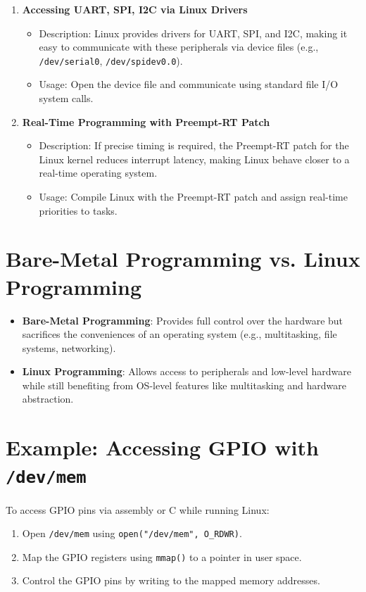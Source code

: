 \documentclass{article}
\begin{document}
\begin{enumerate}
    \item \textbf{Accessing UART, SPI, I2C via Linux Drivers}
    \begin{itemize}
        \item Description: Linux provides drivers for UART, SPI, and I2C, making it easy to communicate with these peripherals via device files (e.g., \texttt{/dev/serial0}, \texttt{/dev/spidev0.0}).
        \item Usage: Open the device file and communicate using standard file I/O system calls.
    \end{itemize}

    \item \textbf{Real-Time Programming with Preempt-RT Patch}
    \begin{itemize}
        \item Description: If precise timing is required, the Preempt-RT patch for the Linux kernel reduces interrupt latency, making Linux behave closer to a real-time operating system.
        \item Usage: Compile Linux with the Preempt-RT patch and assign real-time priorities to tasks.
    \end{itemize}
\end{enumerate}

\section{Bare-Metal Programming vs. Linux Programming}
\begin{itemize}
    \item \textbf{Bare-Metal Programming}: Provides full control over the hardware but sacrifices the conveniences of an operating system (e.g., multitasking, file systems, networking).
    \item \textbf{Linux Programming}: Allows access to peripherals and low-level hardware while still benefiting from OS-level features like multitasking and hardware abstraction.
\end{itemize}

\section{Example: Accessing GPIO with \texttt{/dev/mem}}

To access GPIO pins via assembly or C while running Linux:
\begin{enumerate}
    \item Open \texttt{/dev/mem} using \texttt{open("/dev/mem", O\_RDWR)}.
    \item Map the GPIO registers using \texttt{mmap()} to a pointer in user space.
    \item Control the GPIO pins by writing to the mapped memory addresses.
\end{enumerate}
\end{document}
